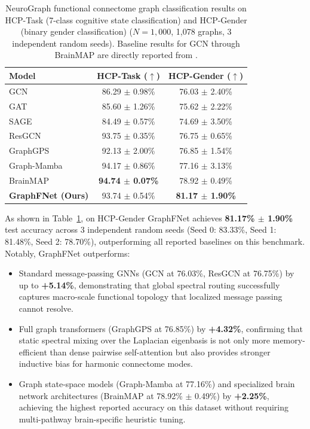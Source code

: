 \documentclass[10pt]{article}
\begin{document}
\begin{table}[t]
\caption{NeuroGraph \citep{said2023neurograph} functional connectome graph classification results on HCP-Task (7-class cognitive state classification) and HCP-Gender (binary gender classification) ($N=1,000$, 1,078 graphs, 3 independent random seeds). Baseline results for GCN through BrainMAP are directly reported from \citet{wang2025brainmap}.}
\label{tab:hcp_results}
\centering
\begin{tabular}{lcc}
\toprule
\textbf{Model} & \textbf{HCP-Task ($\uparrow$)} & \textbf{HCP-Gender ($\uparrow$)} \\
\midrule
GCN \citep{kipf2017gcn}                                    & 86.29 $\pm$ 0.98\% & 76.03 $\pm$ 2.40\% \\
GAT \citep{velickovic2018graph}                            & 85.60 $\pm$ 1.26\% & 75.62 $\pm$ 2.22\% \\
SAGE \citep{hamilton2017inductive}                         & 84.49 $\pm$ 0.57\% & 74.69 $\pm$ 3.50\% \\
ResGCN \citep{chen2020simple}                              & 93.75 $\pm$ 0.35\% & 76.75 $\pm$ 0.65\% \\
GraphGPS \citep{rampasek2022recipe}                        & 92.13 $\pm$ 2.00\% & 76.85 $\pm$ 1.54\% \\
Graph-Mamba \citep{wang2024graphmamba}                     & 94.17 $\pm$ 0.86\% & 77.16 $\pm$ 3.13\% \\
BrainMAP \citep{wang2025brainmap}                          & \textbf{94.74 $\pm$ 0.07\%} & 78.92 $\pm$ 0.49\% \\
\midrule
\textbf{GraphFNet (Ours)}                                 & 93.74 $\pm$ 0.54\% & \textbf{81.17 $\pm$ 1.90\%} \\
\bottomrule
\end{tabular}
\end{table}

As shown in Table~\ref{tab:hcp_results}, on HCP-Gender GraphFNet achieves \textbf{81.17\% $\pm$ 1.90\%} test accuracy across 3 independent random seeds (Seed 0: 83.33\%, Seed 1: 81.48\%, Seed 2: 78.70\%), outperforming all reported baselines on this benchmark. Notably, GraphFNet outperforms:
\begin{itemize}[leftmargin=2em]
    \item Standard message-passing GNNs (GCN at 76.03\%, ResGCN at 76.75\%) by up to \textbf{+5.14\%}, demonstrating that global spectral routing successfully captures macro-scale functional topology that localized message passing cannot resolve.
    \item Full graph transformers (GraphGPS at 76.85\%) by \textbf{+4.32\%}, confirming that static spectral mixing over the Laplacian eigenbasis is not only more memory-efficient than dense pairwise self-attention but also provides stronger inductive bias for harmonic connectome modes.
    \item Graph state-space models (Graph-Mamba at 77.16\%) and specialized brain network architectures (BrainMAP at 78.92\% $\pm$ 0.49\%) by \textbf{+2.25\%}, achieving the highest reported accuracy on this dataset without requiring multi-pathway brain-specific heuristic tuning.
\end{itemize}
\end{document}
